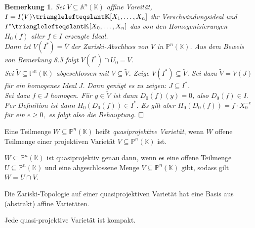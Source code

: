 \documentclass[11pt]{book}
\newtheorem{remark}[theorem]{Bemerkung}
\theoremstyle{nonumberbreak}
\newenvironment{pr}[1][]{\ifthenelse{\equal{#1}{}}{\proof}{\proof[#1]}\rm}{\endproof}
\newenvironment{definbem}[1][]{\ifthenelse{\equal{#1}{}}{\definibem}{\definibem[#1]}\rm}{\enddefinibem}
\begin{document}
\begin{spacing}{1.3}
\begin{remark}
Sei $V \subseteq \mathbb{A}^n(\mathbb{K})$ affine Vareität, $I= I(V) \trianglelefteqslant \mathbb{K}[X_1, \ldots, X_n]$ ihr Verschwindungsideal und $I^{*} \trianglelefteqslant \mathbb{K}[X_0, \ldots, X_n]$ das von den Homogenisierungen $H_0(f)$ aller $f \in I$ erzeugte Ideal.\\
Dann ist $V(I^{*})=\overline{V}$ der Zariski-Abschluss von $V$ in $\mathbb{P}^n(\mathbb{K})$.
\begin{pr}
Aus dem Beweis von Bemerkung 8.5 folgt $V(I^{*}) \cap U_0=V$.\\
Sei $\tilde{V}\subseteq \mathbb{P}^n(\mathbb{K})$ abgeschlossen mit $V \subseteq \tilde{V}$. Zeige $V(I^{*}) \subseteq \tilde{V}$. Sei dazu $\tilde{V}=V(J)$ für ein homogenes Ideal $J$. Dann genügt es zu zeigen: $J \subseteq I^{*}$.\\
Sei dazu $f \in J$ homogen. Für $y\in \tilde{V}$ ist dann $D_0(f)(y)=0$, also $D_0(f) \in I$. Per Definition ist dann $H_0(D_0(f)) \in I^{*}$. Es gilt aber 
$H_0(D_0(f))= f \cdot X_0^{-e}$ für ein $e \geqslant 0,$
es folgt also die Behauptung. $\hfill \Box$
\end{pr}
\end{remark}

\begin{definbem} %

\begin{compactenum}
\item Eine Teilmenge $W \subseteq \mathbb{P}^n(\mathbb{K})$ heißt \textit{quasiprojektive Varietät}, wenn $W$ offene Teilmenge einer projektiven Varietät $V \subseteq \mathbb{P}^n(\mathbb{K})$ ist.
\item $W \subseteq \mathbb{P}^n(\mathbb{K})$ ist quasiprojektiv genau dann, wenn es eine offene Teilmenge $U \subseteq \mathbb{P}^n(\mathbb{K})$ und eine abgeschlossene Menge $V \subseteq \mathbb{P}^n(\mathbb{K})$ gibt, sodass gilt $W=U \cap V$.
\item Die Zariski-Topologie auf einer quasiprojektiven Varietät hat eine Basis aus (abstrakt) affine Varietäten.
\item Jede quasi-projektive Varietät ist kompakt.
\end{compactenum}


\end{definbem}
\end{spacing}
\end{document}
